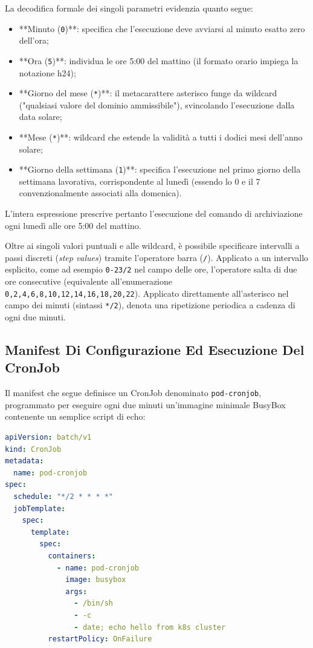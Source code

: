 \documentclass[11pt, a4paper]{article}
\begin{document}
La decodifica formale dei singoli parametri evidenzia quanto segue:
\begin{itemize}[noitemsep]
    \item **Minuto (\texttt{0})**: specifica che l'esecuzione deve avviarsi al minuto esatto zero dell'ora;
    \item **Ora (\texttt{5})**: individua le ore 5:00 del mattino (il formato orario impiega la notazione h24);
    \item **Giorno del mese (\texttt{*})**: il metacarattere asterisco funge da wildcard ("qualsiasi valore del dominio ammissibile"), svincolando l'esecuzione dalla data solare;
    \item **Mese (\texttt{*})**: wildcard che estende la validità a tutti i dodici mesi dell'anno solare;
    \item **Giorno della settimana (\texttt{1})**: specifica l'esecuzione nel primo giorno della settimana lavorativa, corrispondente al lunedì (essendo lo 0 e il 7 convenzionalmente associati alla domenica).
\end{itemize}
L'intera espressione prescrive pertanto l'esecuzione del comando di archiviazione ogni lunedì alle ore 5:00 del mattino.

Oltre ai singoli valori puntuali e alle wildcard, è possibile specificare intervalli a passi discreti (\emph{step values}) tramite l'operatore barra (\texttt{/}). Applicato a un intervallo esplicito, come ad esempio \texttt{0-23/2} nel campo delle ore, l'operatore salta di due ore consecutive (equivalente all'enumerazione \texttt{0,2,4,6,8,10,12,14,16,18,20,22}). Applicato direttamente all'asterisco nel campo dei minuti (sintassi \texttt{*/2}), denota una ripetizione periodica a cadenza di ogni due minuti.

\subsection{Manifest Di Configurazione Ed Esecuzione Del CronJob}

Il manifest che segue definisce un CronJob denominato \texttt{pod-cronjob}, programmato per eseguire ogni due minuti un'immagine minimale BusyBox contenente un semplice script di echo:

\begin{lstlisting}[language=yaml]
apiVersion: batch/v1
kind: CronJob
metadata:
  name: pod-cronjob
spec:
  schedule: "*/2 * * * *"
  jobTemplate:
    spec:
      template:
        spec:
          containers:
            - name: pod-cronjob
              image: busybox
              args:
                - /bin/sh
                - -c
                - date; echo hello from k8s cluster
          restartPolicy: OnFailure
\end{lstlisting}
\end{document}

